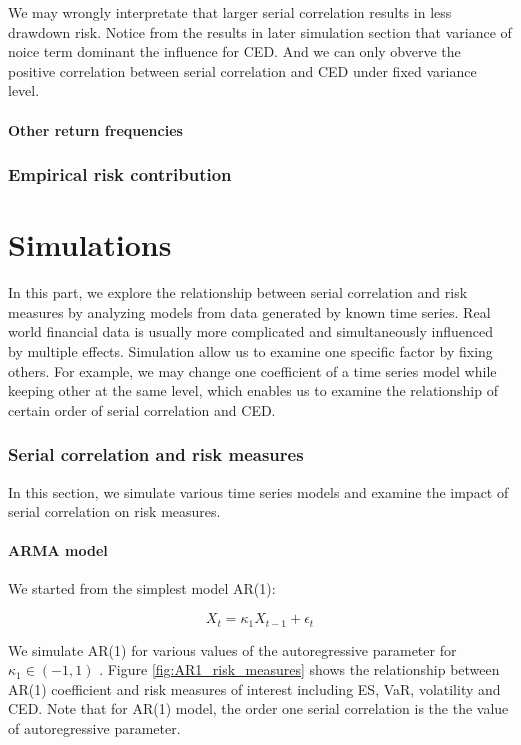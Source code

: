 \documentclass[11pt]{article}
\begin{document}
We may wrongly interpretate that larger serial correlation results in less drawdown risk. Notice from the results in later simulation section that variance of noice term dominant the influence for CED. And we can only obverve the positive correlation between serial correlation and CED under fixed variance level.


\subsection{Other return frequencies}

\section{Empirical risk contribution}

\part{Simulations}

In this part, we explore the relationship between serial correlation and risk measures by analyzing models from data generated by known time series. Real world financial data is usually more complicated and simultaneously influenced by multiple effects. Simulation allow us to examine one specific factor by fixing others. For example, we may change one coefficient of a time series model while keeping other at the same level, which enables us to examine the relationship of certain order of serial correlation and CED.

\section{Serial correlation and risk measures}

In this section, we simulate various time series models and examine the impact of serial correlation on risk measures.

\subsection{ARMA model}

We started from the simplest model AR(1):

\begin{equation}
X_t = \kappa_1X_{t-1} + \epsilon_t
\end{equation}

We simulate AR(1) for various values of the autoregressive parameter for $\kappa_1 \in (-1, 1)$ . Figure \ref{fig:AR1_risk_measures} shows the relationship between AR(1) coefficient and risk measures of interest including ES, VaR, volatility and CED. Note that for AR(1) model, the order one serial correlation is the the value of autoregressive parameter.
\end{document}
